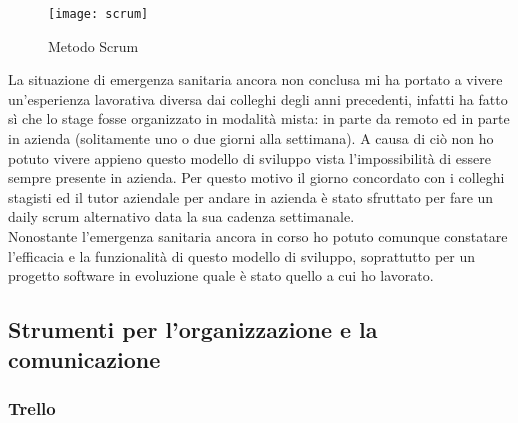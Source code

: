 \begin{figure}[H]
	\begin{center}
		\texttt{[image: scrum]}
		\caption{Metodo Scrum}
	\end{center}
\end{figure}
La situazione di emergenza sanitaria ancora non conclusa mi ha portato a vivere un'esperienza lavorativa diversa dai colleghi degli anni precedenti, infatti ha fatto sì che lo stage fosse organizzato in modalità mista: in parte da remoto ed in parte in azienda (solitamente uno o due giorni alla settimana). A causa di ciò non ho potuto vivere appieno questo modello di sviluppo vista l'impossibilità di essere sempre presente in azienda. Per questo motivo il giorno concordato con i colleghi stagisti ed il tutor aziendale per andare in azienda è stato sfruttato per fare un daily scrum alternativo data la sua cadenza settimanale.\\ 
Nonostante l'emergenza sanitaria ancora in corso ho potuto comunque constatare l’efficacia e la funzionalità di questo modello di sviluppo, soprattutto per un progetto software in evoluzione quale è stato quello a cui ho lavorato.\\

\subsection{Strumenti per l'organizzazione e la comunicazione}
\label{subsec:strumenti-organizzazione-comunicazione}

\subsubsection{Trello}
\label{subsubsec:trello}

